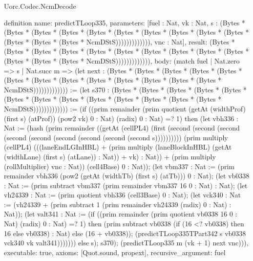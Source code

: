 \begin{lexlean}{Uorc.Codec.NcmDecode}
\begin{semanticmodule}
definition{
  name: predictTLoop335,
  parameters: [fuel : Nat, vk : Nat, s : (Bytes * (Bytes * (Bytes * (Bytes * (Bytes * (Bytes * (Bytes * (Bytes * (Bytes * (Bytes * (Bytes * (Bytes * (Bytes * NcmDStS))))))))))))), vnc : Nat],
  result: (Bytes * (Bytes * (Bytes * (Bytes * (Bytes * (Bytes * (Bytes * (Bytes * (Bytes * (Bytes * (Bytes * (Bytes * (Bytes * NcmDStS))))))))))))),
  body: (match fuel
    | Nat.zero => s
    | Nat.succ m => (let next : (Bytes * (Bytes * (Bytes * (Bytes * (Bytes * (Bytes * (Bytes * (Bytes * (Bytes * (Bytes * (Bytes * (Bytes * (Bytes * NcmDStS))))))))))))) := (let s370 : (Bytes * (Bytes * (Bytes * (Bytes * (Bytes * (Bytes * (Bytes * (Bytes * (Bytes * (Bytes * (Bytes * (Bytes * (Bytes * NcmDStS))))))))))))) := (if ((prim remainder (prim quotient (getAt (widthProf) (first s) (atProf)) (pow2 vk) 0 : Nat) (radix) 0 : Nat) =? 1) then (let vbh336 : Nat := (hash (prim remainder ((getAt (cellPL4) (first (second (second (second (second (second (second (second (second (second s)))))))))) (prim multiply (cellPL4) (((laneEndLGInHBL) + (prim multiply (laneBlockInHBL) (getAt (widthLane) (first s) (atLane)) : Nat)) + vk) : Nat)) + (prim multiply (rollMultiplier) vnc : Nat)) (cell4Base) 0 : Nat)); (let vbm337 : Nat := (prim remainder vbh336 (pow2 (getAt (widthTb) (first s) (atTb))) 0 : Nat); (let vb0338 : Nat := (prim subtract vbm337 (prim remainder vbm337 16 0 : Nat) : Nat); (let vh24339 : Nat := (prim quotient vbh336 (cell3Base) 0 : Nat); (let vck340 : Nat := (vh24339 + (prim subtract 1 (prim remainder vh24339 (radix) 0 : Nat) : Nat)); (let valt341 : Nat := (if ((prim remainder (prim quotient vb0338 16 0 : Nat) (radix) 0 : Nat) =? 1) then (prim subtract vb0338 (if (16 <? vb0338) then 16 else vb0338) : Nat) else (16 + vb0338)); (predictTLoop335TPart342 s vb0338 vck340 vk valt341))))))) else s); s370); (predictTLoop335 m (vk + 1) next vnc))),
  executable: true,
  axioms: [Quot.sound, propext],
  recursive_argument: fuel
}


\end{semanticmodule}
\end{lexlean}
